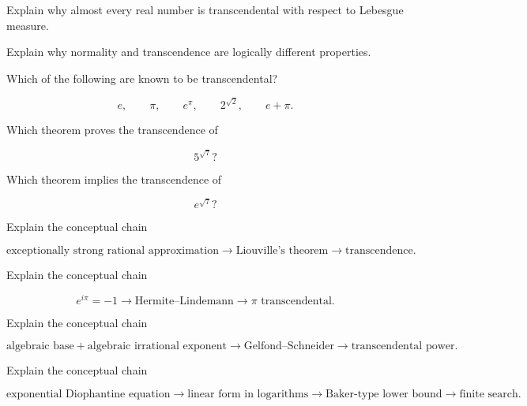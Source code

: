 \begin{exercise}[2]
Explain why almost every real number is transcendental with respect to
Lebesgue measure.
\end{exercise}

\begin{exercise}[2]
Explain why normality and transcendence are logically different properties.
\end{exercise}

\begin{exercise}[2]
Which of the following are known to be transcendental?

\[
e,\qquad
\pi,\qquad
e^\pi,\qquad
2^{\sqrt2},\qquad
e+\pi.
\]
\end{exercise}

\begin{exercise}[2]
Which theorem proves the transcendence of

\[ 5^{\sqrt7}? \]
\end{exercise}

\begin{exercise}[2]
Which theorem implies the transcendence of

\[ e^{\sqrt7}? \]
\end{exercise}

\begin{exercise}[3]
Explain the conceptual chain

\[
\text{exceptionally strong rational approximation}
\longrightarrow
\text{Liouville's theorem}
\longrightarrow
\text{transcendence}.
\]
\end{exercise}

\begin{exercise}[3]
Explain the conceptual chain

\[
e^{i\pi}=-1
\longrightarrow
\text{Hermite--Lindemann}
\longrightarrow
\pi\text{ transcendental}.
\]
\end{exercise}

\begin{exercise}[3]
Explain the conceptual chain

\[
\text{algebraic base}
+
\text{algebraic irrational exponent}
\longrightarrow
\text{Gelfond--Schneider}
\longrightarrow
\text{transcendental power}.
\]
\end{exercise}

\begin{exercise}[3]
Explain the conceptual chain

\[
\text{exponential Diophantine equation}
\longrightarrow
\text{linear form in logarithms}
\longrightarrow
\text{Baker-type lower bound}
\longrightarrow
\text{finite search}.
\]
\end{exercise}

